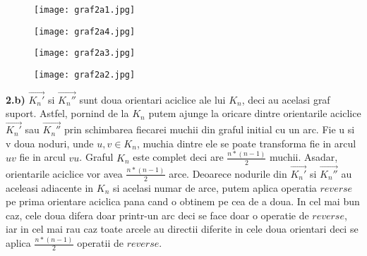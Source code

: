 \documentclass{article}
\begin{document}
\begin{frame}{}
    \begin{figure}[ht]
    \centering
        \begin{minipage}[b]{0.23\linewidth}
           
         
            \caption{}
           
           \texttt{[image: graf2a1.jpg]}
           
        \end{minipage}
        \hspace{0.2cm}
        \begin{minipage}[b]{0.23\linewidth}
          
             \caption{}
            
            \texttt{[image: graf2a4.jpg]}
           
        \end{minipage}
          \hspace{0.2cm}
         \begin{minipage}[b]{0.23\linewidth}
          
             \caption{}
            
            \texttt{[image: graf2a3.jpg]}
           
        \end{minipage}
         \hspace{0.2cm}
         \begin{minipage}[b]{0.23\linewidth}
          
             \caption{}
            
            \texttt{[image: graf2a2.jpg]}
           
        \end{minipage}

    \end{figure}
\end{frame}
\par\textbf{2.b)}  ${\vec{K_{n}'}}$ si ${\vec{K_{n}''}}$ sunt doua orientari aciclice ale lui $K_{n}$, deci au acelasi graf suport. Astfel, pornind de la $K_{n}$ putem ajunge la oricare dintre orientarile aciclice ${\vec{K_{n}'}}$ sau ${\vec{K_{n}''}}$ prin schimbarea fiecarei muchii din graful initial cu un arc. Fie u si v doua noduri, unde $u,v\in K_{n}$, muchia dintre ele se poate transforma fie in arcul $uv$ fie in arcul $vu$. Graful $K_{n}$ este complet deci are $\frac{n*(n-1)}{2}$ muchii. Asadar, orientarile aciclice vor avea $\frac{n*(n-1)}{2}$ arce. Deoarece nodurile din ${\vec{K_{n}'}}$ si ${\vec{K_{n}''}}$ au aceleasi adiacente in $K_{n}$ si acelasi numar de arce, putem aplica operatia $reverse$ pe prima orientare aciclica pana cand o obtinem pe cea de a doua. In cel mai bun caz, cele doua difera doar printr-un arc deci se face doar o operatie de $reverse$, iar in cel mai rau caz toate arcele au directii diferite in cele doua orientari deci se aplica  $\frac{n*(n-1)}{2}$ operatii de $reverse$. 
\end{document}
